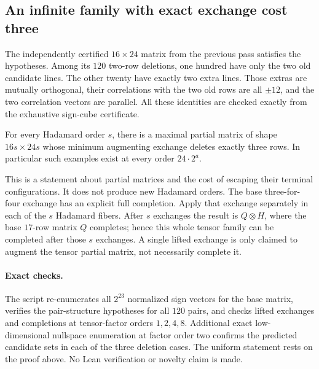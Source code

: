 \subsection{An infinite family with exact exchange cost three}
The independently certified $16\times24$ matrix from the previous pass
satisfies the hypotheses. Among its $120$ two-row deletions, one hundred
have only the two old candidate lines. The other twenty have exactly
two extra lines. Those extras are mutually orthogonal, their
correlations with the two old rows are all $\pm12$, and the two
correlation vectors are parallel. All these identities are checked
exactly from the exhaustive sign-cube certificate.

\begin{corollary}
For every Hadamard order $s$, there is a maximal partial matrix of
shape $16s\times24s$ whose minimum augmenting exchange deletes exactly
three rows. In particular such examples exist at every order
$24\cdot2^a$.
\end{corollary}

This is a statement about partial matrices and the cost of escaping
their terminal configurations. It does not produce new Hadamard orders.
The base three-for-four exchange has an explicit full completion. Apply
that exchange separately in each of the $s$ Hadamard fibers. After
$s$ exchanges the result is $Q\otimes H$, where the base $17$-row
matrix $Q$ completes; hence this whole tensor family can be completed
after those $s$ exchanges. A single lifted exchange is only claimed
to augment the tensor partial matrix, not necessarily complete it.

\paragraph{Exact checks.}
The script  re-enumerates all $2^{23}$
normalized sign vectors for the base matrix, verifies the pair-structure
hypotheses for all $120$ pairs, and checks lifted exchanges and
completions at tensor-factor orders $1,2,4,8$. Additional exact
low-dimensional nullspace enumeration at factor order two confirms
the predicted candidate sets in each of the three deletion cases.
The uniform statement rests on the proof above. No Lean verification
or novelty claim is made.
